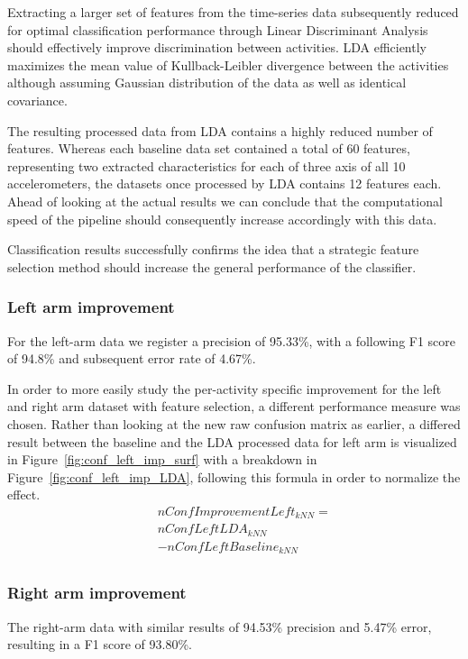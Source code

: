 \documentclass{sig-alternate}
\begin{document}
Extracting a larger set of features from the time-series data subsequently reduced for optimal classification performance through Linear Discriminant Analysis should effectively improve discrimination between activities. LDA efficiently maximizes the mean value of Kullback-Leibler divergence between the activities although assuming Gaussian distribution of the data as well as identical covariance.

The resulting processed data from LDA contains a highly reduced number of features. Whereas each baseline data set contained a total of 60 features, representing two extracted characteristics for each of three axis of all 10 accelerometers, the datasets once processed by LDA contains 12 features each. Ahead of looking at the actual results we can conclude that the computational speed of the pipeline should consequently increase accordingly with this data.

Classification results successfully confirms the idea that a strategic feature selection method should increase the general performance of the classifier.  

\subsubsection{Left arm improvement}
For the left-arm data we register a precision of 95.33\%, with a following F1 score of 94.8\% and subsequent error rate of 4.67\%. 

In order to more easily study the per-activity specific improvement for the left and right arm dataset with feature selection, a different performance measure was chosen. Rather than looking at the new raw confusion matrix as earlier, a differed result between the baseline and the LDA processed data for left arm is visualized in Figure~\ref{fig:conf_left_imp_surf} with a breakdown in Figure~\ref{fig:conf_left_imp_LDA}, following this formula in order to normalize the effect.\\[1em]
\begin{equation}\label{eq:left_LDA_Conf_Imp}
\begin{array}{lcl}
&& nConfImprovementLeft_{kNN} = \\
&& nConfLeftLDA_{kNN} \\
&&- nConfLeftBaseline_{kNN} \\
\end{array}
\end{equation}

\subsubsection{Right arm improvement}
The right-arm data with similar results of 94.53\% precision and 5.47\% error, resulting in a F1 score of 93.80\%.
\end{document}
